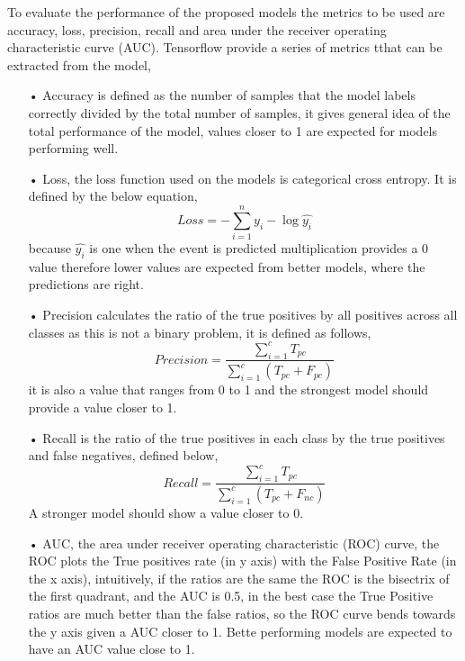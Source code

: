 \documentclass[conference]{IEEEtran}
\begin{document}
To evaluate the performance of the proposed models the metrics to be used are accuracy, loss, precision, recall and area under the receiver operating characteristic curve (AUC).  Tensorflow provide a series of metrics tthat can be extracted from the model, 
\begin{itemize}
\item[•]Accuracy is defined as the number of samples that the model labels correctly divided by the total number of samples, it gives general idea of the total performance of the model, values closer to 1 are expected for models performing well. 
\item[•]Loss, the loss function used on the models is categorical cross entropy. It is defined by the below equation, 
\begin{equation} Loss = -\sum _{i=1}^{n}y_{i}-\log\hat{y_{i}} \end{equation} 
because $\hat{y_{i}} $ is one when the event is predicted multiplication provides a 0 value therefore lower values are expected from better models, where the predictions are right. 
\item[•]Precision calculates the ratio of the true positives by all positives across all classes as this is not a binary problem, it is defined as follows, 
\begin{equation} Precision= \frac{\sum _{i=1}^{c}T_{pc}}{\sum _{i=1}^{c}(T_{pc}+F _{pc})} \end{equation}  
it is also a value that ranges from 0 to 1 and the strongest model should provide a value closer to 1. 
\item[•]Recall is the ratio of the true positives in each class by the true positives and false negatives, defined below,  
\begin{equation} Recall= \frac{\sum _{i=1}^{c}T_{pc}}{\sum _{i=1}^{c}(T_{pc}+F _{nc})} \end{equation}  
A stronger model should show a value closer to 0. 
\item[•]AUC, the area under receiver operating characteristic (ROC) curve, the ROC plots the True positives rate (in y axis) with the False Positive Rate (in the x axis), intuitively, if the ratios are the same the ROC is the bisectrix of the first quadrant, and the AUC is 0.5, in the best case the True Positive ratios are much better than the false ratios, so the ROC curve bends towards the y axis given a AUC closer to 1. Bette performing models are expected to have an AUC value close to 1.
\end{itemize}\
\end{document}
